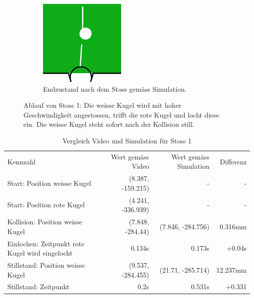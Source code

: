 \begin{figure}[h!]
\begin{subfigure}[t]{0.2\textwidth}
        \includegraphics[width=1.0\linewidth]{../common/04_results/resources/simulation_vs_reality/simulation_vs_reality_1_0008_0011_simulation_cut.png}
        \caption{Endzustand nach dem Stoss gemäss Simulation.}
        \label{fig:simulation_vs_reality_1_0008_0011_simulation}
    \end{subfigure}
    \caption{
        Ablauf von Stoss 1: Die weisse Kugel wird mit hoher Geschwindigkeit angestossen, trifft die rote Kugel und locht diese ein.
        Die weisse Kugel steht sofort nach der Kollision still.
    }
    \label{fig:simulation_vs_reality_1_0008_0011}
\end{figure}

\begin{table}[ht]
    \begin{tabular}{ lrrr }
        \rowcolor{\seccolor!50}
        Kennzahl & Wert gemäss Video & Wert gemäss Simulation & Differenz \\
        Start: Position weisse Kugel & (8.387, -159.215) & - & -\\
        Start: Position rote Kugel & (4.241, -336.939) & - & -\\
        Kollision: Position weisse Kugel & (7.848, -284.44) & (7.846, -284.756) & 0.316mm\\
        Einlochen: Zeitpunkt rote Kugel wird eingelocht & 0.134s & 0.173s & +0.04s\\
        Stillstand: Position weisse Kugel & (9.537, -284.455) & (21.71, -285.714) & 12.237mm\\
        Stillstand: Zeitpunkt & 0.2s & 0.531s & +0.331\\
    \end{tabular}
    \caption{Vergleich Video und Simulation für Stoss 1}
    \label{tab:simulation_vs_reality_1_0008_0011}
\end{table}

